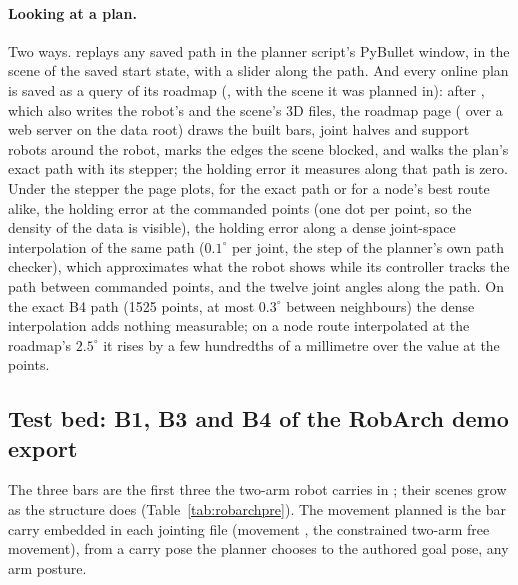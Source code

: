 \paragraph{Looking at a plan.} Two ways. 
replays any saved path in the planner script's PyBullet window, in the scene of the
saved start state, with a slider along the path. And every online plan is saved as a
query of its roadmap (, with the scene
it was planned in): after , which also writes
the robot's and the scene's 3D files, the roadmap page
( over a web server on the data root)
draws the built bars, joint halves and support robots around the robot, marks the
edges the scene blocked, and walks the plan's exact path with its stepper; the
holding error it measures along that path is zero. Under the stepper the page
plots, for the exact path or for a node's best route alike, the holding error at
the commanded points (one dot per point, so the density of the data is visible),
the holding error along a dense joint-space interpolation of the same path
($0.1^\circ$ per joint, the step of the planner's own path checker), which
approximates what the robot shows while its controller tracks the path between
commanded points, and the twelve joint angles along the path. On the exact B4 path
(1525 points, at most $0.3^\circ$ between neighbours) the dense interpolation adds
nothing measurable; on a node route interpolated at the roadmap's $2.5^\circ$ it
rises by a few hundredths of a millimetre over the value at the points.

\subsection{Test bed: B1, B3 and B4 of the RobArch demo export}
\label{sec:scenetest}

The three bars are the first three the two-arm robot carries in
; their scenes grow as the
structure does (Table~\ref{tab:robarchpre}). The movement planned is the bar carry
embedded in each jointing file (movement , the constrained two-arm
free movement), from a carry pose the planner
chooses to the authored goal pose, any arm posture.

\begin{table}[h]
\centering
\footnotesize
\setlength{\tabcolsep}{4pt}
\caption{The three bars, their scenes at carry time, and the roadmap precomputed for
each (6000 sampled nodes plus anchors; 8 workers). B3's and B4's tracking ran while
other jobs used the machine; B1's times are from an idle machine.}
\label{tab:robarchpre}
\end{table}


